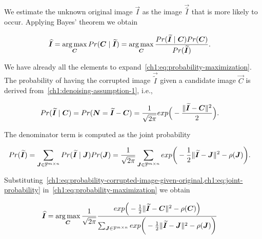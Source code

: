 
 We estimate the unknown original image $\vec{I}$ as the image $\vec{\widehat{I}}$ that is more likely to occur. Applying Bayes' theorem we obtain

\begin{align}
	\bm{\widehat{I}} & = \operatorname*{arg\,max} _{\bm{C}}{Pr(\bm{C} \; | \;\bm{\widetilde{I}})} = \operatorname*{arg\,max} _{\bm{C}} \frac{Pr(\bm{\widetilde{I}} \; | \; \bm{C})Pr(\bm{C})}{Pr(\bm{\widetilde{I}})}.
	\label{ch1:eq:probability-maximization}
\end{align}

We have already all the elements to expand~\cref{ch1:eq:probability-maximization}. The probability of having the corrupted image $\vec{\widetilde{I}}$ given a candidate image $\vec{C}$ is derived from~\cref{ch1:denoising-assumption-1}, i.e.,

\begin{align}
	Pr(\bm{\widetilde{I}} \; | \; \bm{C}) &= Pr( \bm{N} = \bm{\widetilde{I}} - \bm{C} ) = \frac{1}{\sqrt{2\pi}}exp\Big(- \frac{ \lVert\bm{\widetilde{I}} - \bm{C} \rVert^2}{2} \Big).
	\label{ch1:eq:probability-corrupted-image-given-original}
\end{align}

The denominator term is computed as the joint probability

\begin{align}
	Pr(\widetilde{\bm{I}}) &= \sum_{\bm{J} \in \mathbb{F}^{m \times n}}{Pr(\bm{\widetilde{I}}\;|\; \bm{J})Pr(\bm{J})} = \frac{1}{\sqrt{2 \pi}}\sum_{\bm{J} \in \mathbb{F}^{m \times n}}{exp\bigg(-\frac{1}{2}\lVert\widetilde{\bm{I}}-\bm{J}\rVert^2 - \rho(\bm{J})}\bigg).
	\label{ch1:eq:joint-probability}
\end{align}

Substituting~\cref{ch1:eq:probability-corrupted-image-given-original,ch1:eq:joint-probability} in~\cref{ch1:eq:probability-maximization} we obtain

\begin{align}
	\bm{\widehat{I}} & = \operatorname*{arg\,max} _{\bm{C}} \frac{1}{\sqrt{2\pi}} \frac{exp\Big(- \frac{1}{2}\lVert\bm{\widetilde{I}} - \bm{C}\rVert^2 - \rho(\bm{C}) \Big) }{ \sum_{\bm{J} \in \mathbb{F}^{m \times n}}{exp\bigg(-\frac{1}{2}\lVert\widetilde{\bm{I}}-\bm{J}\rVert^2 - \rho(\bm{J})}\bigg) }
	\label{ch1:eq:probability-maximization-expanded}
\end{align}

